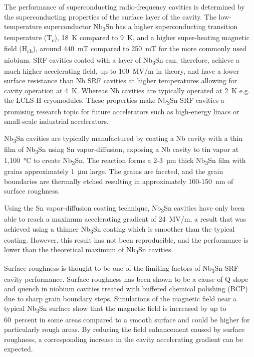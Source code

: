 \documentclass[reprint,amsmath,amssymb,aps]{revtex4-2}%
\begin{document}
The performance of superconducting radio-frequency cavities is determined by the superconducting properties of the surface layer of the cavity. The low-temperature superconductor Nb\textsubscript{3}Sn has a higher superconducting transition temperature (T\textsubscript{c}), 18~K compared to 9~K, and a higher super-heating magnetic field (H\textsubscript{sh}), around 440~mT compared to 250~mT for the more commonly used niobium\cite{liarte2017theoretical, catelani2008temperature, lin2012effect, kubo2020superfluid}. SRF cavities coated with a layer of Nb\textsubscript{3}Sn can, therefore, achieve a much higher accelerating field, up to 100~MV/m in theory, and have a lower surface resistance than Nb SRF cavities at higher temperatures allowing for cavity operation at 4~K. Whereas Nb cavities are typically operated at 2~K e.g. the LCLS-II cryomodules\cite{galayda2018lcls}. These properties make Nb\textsubscript{3}Sn SRF cavities a promising research topic for future accelerators such as high-energy linacs or small-scale industrial accelerators.

Nb\textsubscript{3}Sn cavities are typically manufactured by coating a Nb cavity with a thin film of Nb\textsubscript{3}Sn using Sn vapor-diffusion\cite{posen2017nb3sn, pudasaini2019growth, porter2018update}, exposing a Nb cavity to tin vapor at 1,100~°C to create Nb\textsubscript{3}Sn. The reaction forms a 2-3~µm thick Nb\textsubscript{3}Sn film with grains approximately 1~\unit{\micro\metre} large. The grains are faceted, and the grain boundaries are thermally etched resulting in approximately 100-150~nm of surface roughness. 

Using the Sn vapor-diffusion coating technique\cite{posen2017nb3sn,pudasaini2019growth,eremeev2013development}, Nb\textsubscript{3}Sn cavities have only been able to reach a maximum accelerating gradient of 24~MV/m\cite{posen2021advances}, a result that was achieved using a thinner Nb\textsubscript{3}Sn coating which is smoother than the typical coating. However, this result has not been reproducible, and the performance is lower than the theoretical maximum of Nb\textsubscript{3}Sn cavities.

Surface roughness is thought to be one of the limiting factors of Nb\textsubscript{3}Sn SRF cavity performance. Surface roughness has been shown to be a cause of Q slope and quench in niobium cavities treated with buffered chemical polishing (BCP) due to sharp grain boundary steps.\cite{knobloch1999high, xu2016simulation} Simulations of the magnetic field near a typical Nb\textsubscript{3}Sn surface show that the magnetic field is increased by up to 60~percent in some areas compared to a smooth surface\cite{porter2016surface, kubo2015magnetic} and could be higher for particularly rough areas. By reducing the field enhancement caused by surface roughness, a corresponding increase in the cavity accelerating gradient can be expected. 
\end{document}
